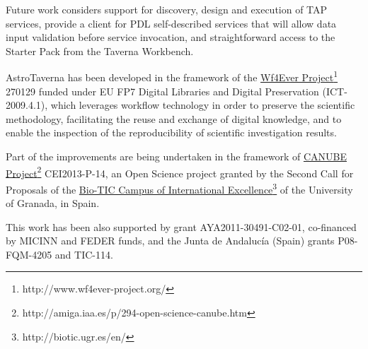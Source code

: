 \documentclass{aa}
\begin{document}
Future work considers support for discovery, design and execution of TAP services, provide a client for PDL self-described services that will allow data input validation before service invocation, and straightforward access to the Starter Pack from the Taverna Workbench.

\begin{acknowledgements}

AstroTaverna has been developed in the framework of the \href{http://www.wf4ever-project.org/}{Wf4Ever Project}\footnote{http://www.wf4ever-project.org/} 270129 funded under EU FP7 Digital Libraries and Digital Preservation (ICT-2009.4.1), which leverages workflow technology in order to preserve the scientific methodology, facilitating the reuse and exchange of digital knowledge, and to enable the inspection of the reproducibility of scientific investigation results.

Part of the improvements are being undertaken in the framework of \href{http://amiga.iaa.es/p/294-open-science-canube.htm}{CANUBE Project}\footnote{http://amiga.iaa.es/p/294-open-science-canube.htm} CEI2013-P-14, an Open Science project granted by the Second Call for Proposals of the \href{http://biotic.ugr.es/en/}{Bio-TIC Campus of International Excellence}\footnote{http://biotic.ugr.es/en/} of the University of Granada, in Spain.

This work has been also supported by grant AYA2011-30491-C02-01, co-financed by MICINN and FEDER funds, and the Junta de Andalucía (Spain) grants P08-FQM-4205 and TIC-114.

\end{acknowledgements}


\end{document}
